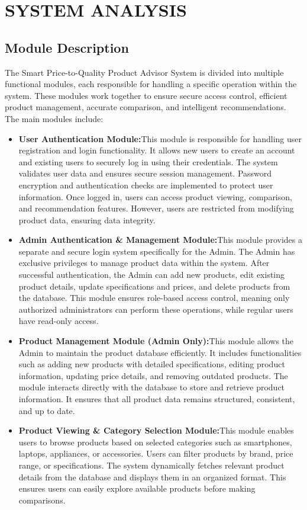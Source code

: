 \chapter{SYSTEM ANALYSIS }
 
 \section{Module Description}
 The Smart Price-to-Quality Product Advisor System is divided into multiple functional modules, each responsible for handling a specific operation within the system. These modules work together to ensure secure access control, efficient product management, accurate comparison, and intelligent recommendations. The main modules include:
 \begin{itemize}
    \item \textbf{User Authentication Module:}This module is responsible for handling user registration and login functionality. It allows new users to create an account and existing users to securely log in using their credentials. The system validates user data and ensures secure session management. Password encryption and authentication checks are implemented to protect user information. Once logged in, users can access product viewing, comparison, and recommendation features. However, users are restricted from modifying product data, ensuring data integrity.
    \item \textbf{Admin Authentication \& Management Module:}This module provides a separate and secure login system specifically for the Admin. The Admin has exclusive privileges to manage product data within the system. After successful authentication, the Admin can add new products, edit existing product details, update specifications and prices, and delete products from the database. This module ensures role-based access control, meaning only authorized administrators can perform these operations, while regular users have read-only access.
    \item \textbf{Product Management Module (Admin Only):}This module allows the Admin to maintain the product database efficiently. It includes functionalities such as adding new products with detailed specifications, editing product information, updating price details, and removing outdated products. The module interacts directly with the database to store and retrieve product information. It ensures that all product data remains structured, consistent, and up to date.
    \item \textbf{Product Viewing \& Category Selection Module:}This module enables users to browse products based on selected categories such as smartphones, laptops, appliances, or accessories. Users can filter products by brand, price range, or specifications. The system dynamically fetches relevant product details from the database and displays them in an organized format. This ensures users can easily explore available products before making comparisons.

\end{itemize}
